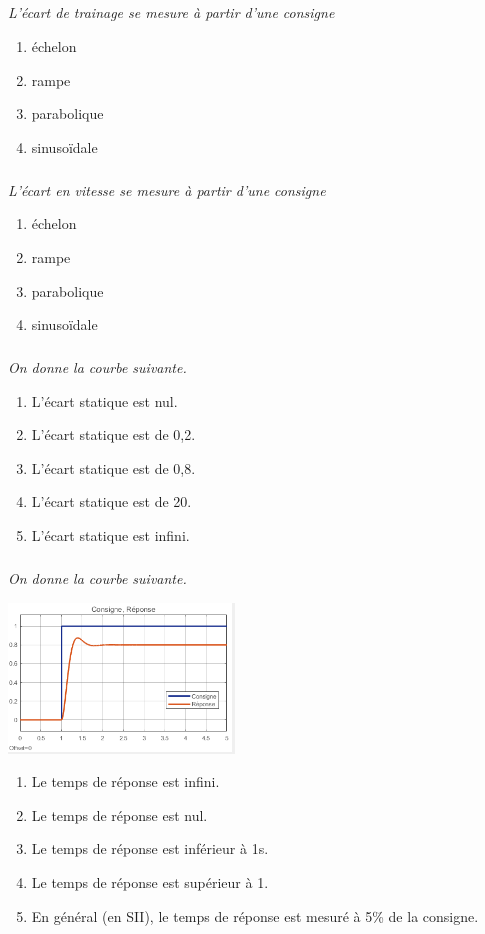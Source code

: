 \documentclass[10pt,fleqn]{article} %
\begin{document}
\begin{multicols}{2}
\subparagraph{}\textit{L'écart de trainage se mesure à partir d'une consigne}
\begin{enumerate}
\item échelon
\item rampe
\item parabolique
\item sinusoïdale
\end{enumerate}

\subparagraph{}\textit{L'écart en vitesse se mesure à partir d'une consigne}
\begin{enumerate}
\item échelon
\item rampe
\item parabolique
\item sinusoïdale
\end{enumerate}

\subparagraph{}\textit{On donne la courbe suivante.}
\begin{enumerate}
\item L'écart statique est nul.
\item L'écart statique est de 0,2.
\item L'écart statique est de 0,8.
\item L'écart statique est de 20.
\item L'écart statique est infini.
\end{enumerate}

\subparagraph{}\textit{On donne la courbe suivante.}
\begin{center}
\includegraphics[width=6cm]{images/Ord2_Ech_K}
\end{center}
\begin{enumerate}
\item Le temps de réponse est infini.
\item Le temps de réponse est nul.
\item Le temps de réponse est inférieur à 1s.
\item Le temps de réponse est supérieur à 1.
\item En général (en SII), le temps de réponse est mesuré à 5\% de la
consigne.
\end{enumerate}


\end{multicols}
\end{document}
